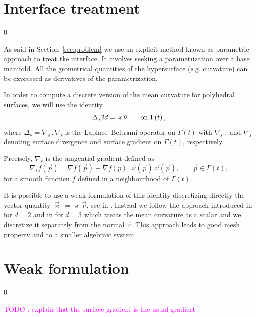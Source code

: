 \documentclass[a4paper,12pt,onecolumn]{article}
\newcommand{\nabs}{\nabla_{\!s}}
\newcommand{\id}{\rm id}
\begin{document}
\section{Interface treatment}
\setcounter{equation} 0

As said in Section~\ref{sec:problem} we use an explicit method known as
parametric approach to treat the interface. It involves seeking a
parametrization over a base manifold. All the geometrical quantities of the
hypersurface (e.g. curvature) can be expressed as derivatives of the
parametrization.

In order to compute a discrete version of the mean curvature for polyhedral
surfaces, we will use the identity
\begin{equation} \label{eq:LBop}
\Delta_s\, \vec \id = \varkappa\, \vec\nu \qquad \mbox{on $\Gamma(t)$}\,,
\end{equation}
where $\Delta_s = \nabs\,.\,\nabs$ is the Laplace--Beltrami operator on
$\Gamma(t)$ with $\nabs\,.\,$ and $\nabs$ denoting surface divergence and
surface gradient on $\Gamma(t)$, respectively.

Precisely, $\nabla_s$ is the tangential gradient defined as
\begin{equation}\label{eq:tangent_gradient}
\nabla_s f(\vec{p})=\nabla f(\vec{p})-\nabla
f(p)\,.\,\vec{\nu}(\vec{p})\,\vec{\nu}(\vec{p}),\qquad \vec{p}\in\Gamma(t),
\end{equation}
for a smooth function $f$ defined in a neighbourhood of $\Gamma(t)$.

It is possible to use a weak formulation of this identity discretizing directly
the vector quantity $\vec\varkappa:=\varkappa\,\vec\nu$, see in
\cite{Dziuk91,Bansch01,GanesanMT07}. Instead we follow the approach introduced
in \cite{triplej} for $d=2$ and in \cite{gflows3d} for $d=3$ which treats the
mean curvature as a scalar and we discretize it separately from the normal
$\vec\nu$. This approach leads to good mesh property and to a smaller algebraic
system.

\section{Weak formulation}\label{sec:weak_formulation}
\setcounter{equation} 0

\textcolor{magenta}{TODO : explain that the surface gradient is the usual
gradient}
\end{document}
